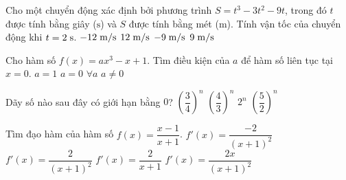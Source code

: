 \begin{ex}%
	Cho một chuyển động xác định bởi phương trình $S=t^3-3t^2-9t$, trong đó $t$ được tính bằng giây ($\mathrm{s}$) và $S$ được tính bằng mét ($\mathrm{m}$). Tính vận tốc của chuyển động khi $t=2\hspace{0.1cm} \mathrm{s}$.
	\choice
	{$-12\hspace{0.1cm} \mathrm{m/s}$}
	{$12 \hspace{0.1cm} \mathrm{m/s}$}
	{\True $-9 \hspace{0.1cm} \mathrm{m/s}$}
	{$9 \hspace{0.1cm} \mathrm{m/s}$}
\end{ex}

\begin{ex}%
	Cho hàm số $f(x)=ax^3-x+1$. Tìm điều kiện của $a$ để hàm số liên tục tại $x=0$.
	\choice
	{$a=1$}
	{$a=0$}
	{\True $\forall a$}
	{$a\ne 0$}
\end{ex}

\begin{ex}%
	Dãy số nào sau đây có giới hạn bằng $0$?
\choice
	{\True $\left(\dfrac{3}{4}\right)^n$}
	{$\left(\dfrac{4}{3}\right)^n$}
	{$2^n$}
	{$\left(\dfrac{5}{2}\right)^n$}
\end{ex}

\begin{ex}%
	Tìm đạo hàm của hàm số $f(x)=\dfrac{x-1}{x+1}$.
	\choice
		{$f'(x)=\dfrac{-2}{(x+1)^2}$}
		{\True $f'(x)=\dfrac{2}{(x+1)^2}$}
		{$f'(x)=\dfrac{2}{x+1}$}
		{$f'(x)=\dfrac{2x}{(x+1)^2}$}
\end{ex}

